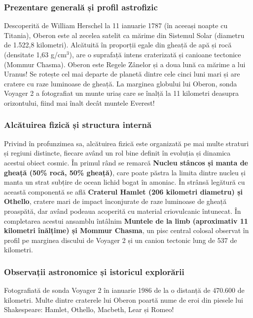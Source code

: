 \subsubsection*{Prezentare generală și profil astrofizic}
Descoperită de William Herschel la 11 ianuarie 1787 (în aceeași noapte cu Titania), Oberon este al zecelea satelit ca mărime din Sistemul Solar (diametru de 1.522,8 kilometri). Alcătuită în proporții egale din gheață de apă și rocă (densitate 1,63 g/cm$^3$), are o suprafață intens craterizată și canioane tectonice (Mommur Chasma). Oberon este Regele Zânelor și a doua lună ca mărime a lui Uranus! Se rotește cel mai departe de planetă dintre cele cinci luni mari și are cratere cu raze luminoase de gheață. La marginea globului lui Oberon, sonda Voyager 2 a fotografiat un munte uriaș care se înalță la 11 kilometri deasupra orizontului, fiind mai înalt decât muntele Everest!

\subsubsection*{Alcătuirea fizică și structura internă}
Privind în profunzimea sa, alcătuirea fizică este organizată pe mai multe straturi și regiuni distincte, fiecare având un rol bine definit în evoluția și dinamica acestui obiect cosmic. În primul rând se remarcă \textbf{Nucleu stâncos și manta de gheață (50\% rocă, 50\% gheață)}, care poate păstra la limita dintre nucleu și manta un strat subțire de ocean lichid bogat în amoniac. În strânsă legătură cu această componentă se află \textbf{Craterul Hamlet (206 kilometri diametru) și Othello}, cratere mari de impact înconjurate de raze luminoase de gheață proaspătă, dar având podeaua acoperită cu material criovulcanic întunecat. În completarea acestui ansamblu întâlnim \textbf{Muntele de la limb (aproximativ 11 kilometri înălțime) și Mommur Chasma}, un pisc central colosal observat în profil pe marginea discului de Voyager 2 și un canion tectonic lung de 537 de kilometri.

\subsubsection*{Observații astronomice și istoricul explorării}
Fotografiată de sonda Voyager 2 în ianuarie 1986 de la o distanță de 470.600 de kilometri. Multe dintre craterele lui Oberon poartă nume de eroi din piesele lui Shakespeare: Hamlet, Othello, Macbeth, Lear și Romeo!

